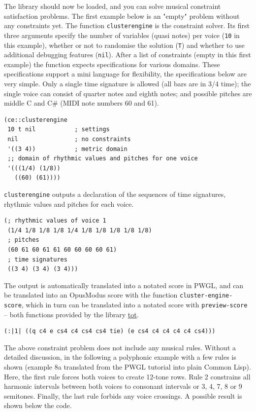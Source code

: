 The library should now be loaded, and you can solve musical constraint satisfaction problems. The first example below is an "empty" problem without any constraints yet. The function \texttt{clusterengine} is the constraint solver. Its first three arguments specify the number of variables (quasi notes) per voice (\texttt{10} in this example), whether or not to randomise the solution (\texttt{T}) and whether to use additional debugging features (\texttt{nil}).  After a list of constraints (empty in this first example) the function expects specifications for various domains. These specifications support a mini language for flexibility, the specifications below are very simple. Only a single time signature is allowed (all bars are in 3/4 time); the single voice can consist of quarter notes and eighth notes; and possible pitches are middle C and C\# (MIDI note numbers 60 and 61).  

\lstset{language=Lisp,label= ,caption= ,captionpos=b,numbers=none}
\begin{lstlisting}
(ce::clusterengine 
 10 t nil           ; settings
 nil                ; no constraints
 '((3 4))           ; metric domain
 ;; domain of rhythmic values and pitches for one voice
 '(((1/4) (1/8))   
   ((60) (61))))
\end{lstlisting}

\texttt{clusterengine} outputs a declaration of the sequences of time signatures, rhythmic values and pitches for each voice. 

\lstset{language=Lisp,label= ,caption= ,captionpos=b,numbers=none}
\begin{lstlisting}
(; rhythmic values of voice 1
 (1/4 1/8 1/8 1/8 1/4 1/8 1/8 1/8 1/8 1/8)
 ; pitches
 (60 61 60 61 61 60 60 60 60 61)
 ; time signatures
 ((3 4) (3 4) (3 4)))
\end{lstlisting}

The output is automatically translated into a notated score in PWGL, and can be translated into an OpusModus score with the function \texttt{cluster-engine-score}, which in turn can be translated into a notated score with \texttt{preview-score} -- both functions provided by the library \href{https://github.com/tanders/tot}{tot}.

\lstset{language=Lisp,label= ,caption= ,captionpos=b,numbers=none}
\begin{lstlisting}
(:|1| ((q c4 e cs4 c4 cs4 cs4 tie) (e cs4 c4 c4 c4 c4 cs4)))
\end{lstlisting}

The above constraint problem does not include any musical rules. Without a detailed discussion, in the following a polyphonic example with a few rules is shown (example 8a translated from the PWGL tutorial into plain Common Lisp). Here, the first rule forces both voices to create 12-tone rows. Rule 2 constrains all harmonic intervals between both voices to consonant intervals or 3, 4, 7, 8 or 9 semitones. Finally, the last rule forbids any voice crossings. A possible result is shown below the code.

